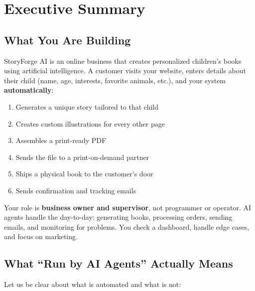 \documentclass[12pt, letterpaper, oneside]{book}
\begin{document}
\tableofcontents
\newpage

\chapter*{Executive Summary}

\section*{What You Are Building}

StoryForge AI is an online business that creates personalized children's books using artificial intelligence. A customer visits your website, enters details about their child (name, age, interests, favorite animals, etc.), and your system \textbf{automatically}:

\begin{enumerate}[leftmargin=2em]
  \item Generates a unique story tailored to that child
  \item Creates custom illustrations for every other page
  \item Assembles a print-ready PDF
  \item Sends the file to a print-on-demand partner
  \item Ships a physical book to the customer's door
  \item Sends confirmation and tracking emails
\end{enumerate}

\noindent Your role is \textbf{business owner and supervisor}, not programmer or operator. AI agents handle the day-to-day: generating books, processing orders, sending emails, and monitoring for problems. You check a dashboard, handle edge cases, and focus on marketing.

\section*{What ``Run by AI Agents'' Actually Means}

Let us be clear about what is automated and what is not:
\end{document}
